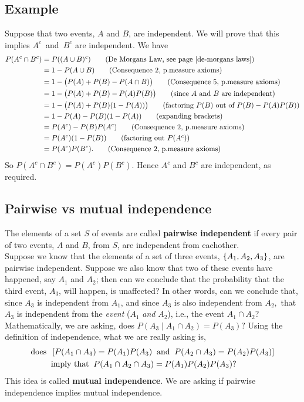 \subsection{Example} \label{exacbc}
Suppose that two events, $A$ and $B$, are independent. We will prove that this implies $A^c$~and~$B^c$ are independent. We have
\begin{align*}
P(A^c \cap B^c) & = P((A \cup B)^c) \tag{De Morgans Law, see page \pageref{de-morgans laws}} \\
			  & = 1 - P(A \cup B) \tag{Consequence 2, p.measure axioms} \\
			  & = 1 - \big(P(A) + P(B) - P(A \cap B)\big) \tag{Consequence 5, p.measure axioms} \\
			  & = 1 - \big(P(A) + P(B) - P(A)P(B)\big) \tag{since $A$ and $B$ are independent} \\
			  & = 1 - \big{(}P(A) + P(B)(1-P(A))\big{)} \tag{factoring $P(B)$ out of $P(B) - P(A)P(B)$} \\
			  & = 1 - P(A) - P(B)(1-P(A)) \tag{expanding brackets} \\
			  & = P(A^c) - P(B)P(A^c) \tag{Consequence 2, p.measure axioms} \\
			  & = P(A^c)(1-P(B)) \tag{factoring out $P(A^c)$} \\
			  & = P(A^c)P(B^c). \tag{Consequence 2, p.measure axioms}
\end{align*}
So $P(A^c \cap B^c) = P(A^c)P(B^c).$ Hence $A^c$ and $B^c$ are independent, as required.

\subsection{Pairwise vs mutual independence} \label{pairwise independent} \label{mutual independence}
The elements of a set $S$ of events are called \textbf{pairwise independent} if every pair of two events, $A$ and $B$, from $S$, are independent from eachother.  \\

\noindent Suppose we know that the elements of a set of three events, $\left\{A_1, A_2,A_3\right\}$, are pairwise independent. Suppose we also know that two of these events have happened, say $A_1$ and $A_2$; then can we conclude that the probability that the third event, $A_3$, will happen, is unaffected? In other words, can we conclude that, since $A_3$ is independent from $A_1$, and since $A_3$ is also independent from $A_2,$ that $A_3$ is independent from the \textit{event} ($A_1$ \textit{and} $A_2$), i.e., the event $A_1 \cap A_2$? Mathematically, we are asking, does $P(A_3 \! \mid \! A_1 \cap A_2) = P(A_3)?$ Using the definition of independence, what we are really asking is,
\begin{align*}
\text{does} \;\; & \left[P(A_1 \cap A_3) = P(A_1)P(A_3) \;\; \text{and} \;\; P(A_2 \cap A_3) = P(A_2)P(A_3)\right] \\
			& \text{imply that} \;\; P(A_1 \cap A_2 \cap A_3) = P(A_1)P(A_2)P(A_3)?
\end{align*}
This idea is called \textbf{mutual independence}. We are asking if pairwise independence implies mutual independence.

